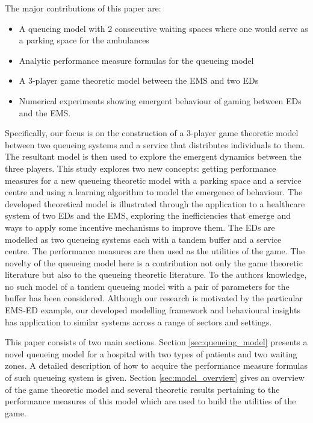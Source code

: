 The major contributions of this paper are:
\begin{itemize}
    \item A queueing model with 2 consecutive waiting spaces where one would 
    serve as a parking space for the ambulances
    \item Analytic performance measure formulas for the queueing model
    \item A 3-player game theoretic model between the EMS and two EDs
    \item Numerical experiments showing emergent behaviour of gaming between
    EDs and the EMS.
\end{itemize}
Specifically, our focus is on the construction of a 3-player game theoretic 
model between two queueing systems and a service that distributes individuals
to them. 
The resultant model is then used to explore the emergent dynamics between 
the three players.
This study explores two new concepts: getting performance measures for a new
queueing theoretic model with a parking space and a service centre and
using a learning algorithm to model the emergence of behaviour.
The developed theoretical model is illustrated through the application to 
a healthcare system of two EDs and the EMS, exploring the inefficiencies that 
emerge and ways to apply some incentive mechanisms to improve them.
The EDs are modelled as two queueing systems each with a tandem buffer and a 
service centre.
The performance measures are then used as the utilities of the game.
The novelty of the queueing model here is a contribution not only the game 
theoretic literature but also to the queueing theoretic literature.
To the authors knowledge, no such model of a tandem queueing model with a pair 
of parameters for the buffer has been considered.
Although our research is motivated by the particular EMS-ED example, our 
developed modelling framework and behavioural insights has application to 
similar systems across a range of sectors and settings. 

This paper consists of two main sections.
Section \ref{sec:queueing_model} presents a novel queueing model for a hospital
with two types of patients and two waiting zones.
A detailed description of how to acquire the performance measure formulas of 
such queueing system is given.
Section \ref{sec:model_overview} gives an overview of the game theoretic model
and several
theoretic results pertaining to the performance measures of this model which 
are used to build the utilities of the game.